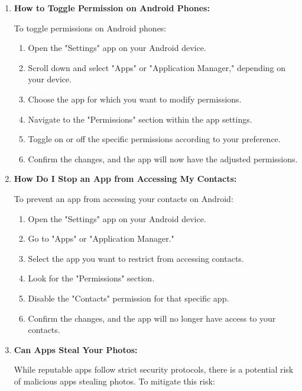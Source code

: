 \documentclass[11pt]{article}
\begin{document}
\begin{enumerate}

    \item \textbf{How to Toggle Permission on Android Phones:}

          To toggle permissions on Android phones:

          \begin{enumerate}
              \item Open the "Settings" app on your Android device.
              \item Scroll down and select "Apps" or "Application Manager," depending on your device.
              \item Choose the app for which you want to modify permissions.
              \item Navigate to the "Permissions" section within the app settings.
              \item Toggle on or off the specific permissions according to your preference.
              \item Confirm the changes, and the app will now have the adjusted permissions.
          \end{enumerate}

    \item \textbf{How Do I Stop an App from Accessing My Contacts:}

          To prevent an app from accessing your contacts on Android:

          \begin{enumerate}
              \item Open the "Settings" app on your Android device.
              \item Go to "Apps" or "Application Manager."
              \item Select the app you want to restrict from accessing contacts.
              \item Look for the "Permissions" section.
              \item Disable the "Contacts" permission for that specific app.
              \item Confirm the changes, and the app will no longer have access to your contacts.
          \end{enumerate}

    \item \textbf{Can Apps Steal Your Photos:}

          While reputable apps follow strict security protocols, there is a potential risk of malicious apps stealing photos. To mitigate this risk:


\end{enumerate}
\end{document}
